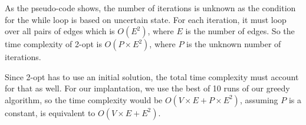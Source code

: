 \documentclass[12pt]{report}
\begin{document}
\begin{multicols}{2}
    As the pseudo-code shows, the number of iterations is unknown as the condition for the while loop is based on uncertain state. For each iteration, it must loop over all pairs of edges which is $O(E^2)$, where $E$ is the number of edges. So the time complexity of 2-opt is $O(P \times E^2)$, where $P$ is the unknown number of iterations.

    Since 2-opt has to use an initial solution, the total time complexity must account for that as well. For our implantation, we use the best of 10 runs of our greedy algorithm, so the time complexity would be $O(V \times E + P \times E^2)$, assuming $P$ is a constant, is equivalent to $O(V \times E + E^2)$.
\end{multicols}

% 
%
\end{document}
